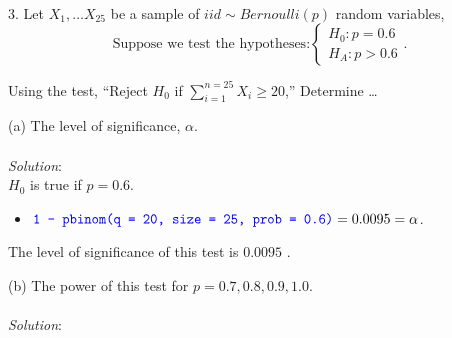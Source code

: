 \documentclass[12pt]{article}
\newcommand{\XB}{\color{black}}
\newcommand{\XBB}{\color{blue}}
\newcommand{\ds}{\displaystyle}
\begin{document}
\newpage
\XBB\hrulefill\XB \\

3. Let $ \ds X_{1}, \dots X_{25} $ be a sample of $ iid \sim Bernoulli(p) $ random variables, \\

\[
    \text{Suppose we test the hypotheses:}
    \left\{
        \begin{array}{rl}
            H_{0} : p = 0.6 \\
            H_{A} : p > 0.6
        \end{array}.
    \right.
\]

Using the test, ``Reject $ H_{0} $ if $ \ds \sum_{i=1}^{n=25} X_{i} \ge 20 $,'' Determine \dots \\

\XBB\hrulefill\XB
\vspace{5mm}

(a) The level of significance, $ \alpha $. \\
\vspace{2.5mm} \\
\textit{Solution}:
\vspace{2.5mm} \\

\noindent
$ H_{0} $ is true if $ p = 0.6 $. \\

\begin{itemize}
    \item $ \ds {\XBB \texttt{1 - pbinom(q = 20, size = 25, prob = 0.6)}} = 0.0095 = \alpha $.
\end{itemize}

\noindent
The level of significance of this test is $ 0.0095 $ . \\

\vspace{2.5mm}

(b) The power of this test for $ p = 0.7, 0.8, 0.9, 1.0 $.  \\
\vspace{2.5mm} \\
\textit{Solution}:
\vspace{2.5mm} \\
\end{document}
